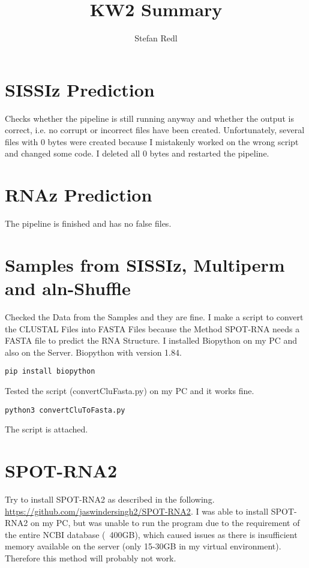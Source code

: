 \documentclass{article}
\title{KW2 Summary}
\author{Stefan Redl}
\begin{document}
\maketitle

\section{SISSIz Prediction}

Checks whether the pipeline is still running anyway and whether the output is correct, i.e. no corrupt or incorrect files have been created. 
Unfortunately, several files with 0 bytes were created because I mistakenly worked on the wrong script and changed some code. 
I deleted all 0 bytes and restarted the pipeline.

\section{RNAz Prediction}

The pipeline is finished and has no false files.

\section{Samples from SISSIz, Multiperm and aln-Shuffle}

Checked the Data from the Samples and they are fine. 
I make a script to convert the CLUSTAL Files into FASTA Files because the Method SPOT-RNA needs a FASTA file to predict the RNA Structure. 
I installed Biopython on my PC and also on the Server. 
\singlespacing
Biopython with version 1.84.

\singlespacing
\begin{lstlisting}
pip install biopython
\end{lstlisting}
\singlespacing
Tested the script (convertCluFasta.py) on my PC and it works fine. 
\singlespacing
\begin{lstlisting}
python3 convertCluToFasta.py 
\end{lstlisting}
\singlespacing
The script is attached.

\section{SPOT-RNA2}

Try to install SPOT-RNA2 as described in the following. 
\singlespacing
\url{https://github.com/jaswindersingh2/SPOT-RNA2}.
\singlespacing
I was able to install SPOT-RNA2 on my PC, but was unable to run the program due to the requirement of the entire NCBI database (~400GB), which caused issues as there is insufficient memory available on the server (only 15-30GB in my virtual environment).
Therefore this method will probably not work. 
\end{document}
